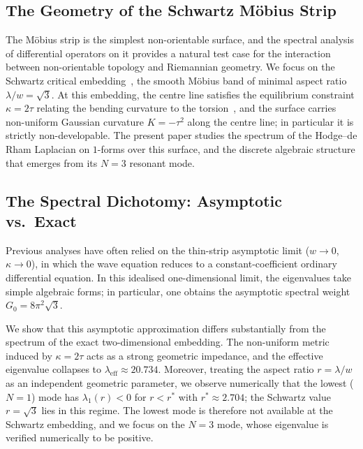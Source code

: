 \documentclass[11pt,a4paper]{article}
\begin{document}
\subsection{The Geometry of the Schwartz M\"obius Strip}
The M\"obius strip is the simplest non-orientable surface, and the spectral analysis of differential operators on it provides a natural test case for the interaction between non-orientable topology and Riemannian geometry. We focus on the Schwartz critical embedding~\cite{Schwartz2023}, the smooth M\"obius band of minimal aspect ratio $\lambda/w = \sqrt{3}$. At this embedding, the centre line satisfies the equilibrium constraint $\kappa = 2\tau$ relating the bending curvature to the torsion~\cite{Starostin2007}, and the surface carries non-uniform Gaussian curvature $K = -\tau^2$ along the centre line; in particular it is strictly non-developable. The present paper studies the spectrum of the Hodge--de Rham Laplacian on $1$-forms over this surface, and the discrete algebraic structure that emerges from its $N=3$ resonant mode.

\subsection{The Spectral Dichotomy: Asymptotic vs.\ Exact}
Previous analyses have often relied on the thin-strip asymptotic limit ($w \to 0$, $\kappa \to 0$), in which the wave equation reduces to a constant-coefficient ordinary differential equation. In this idealised one-dimensional limit, the eigenvalues take simple algebraic forms; in particular, one obtains the asymptotic spectral weight $G_0 = 8\pi^2\sqrt{3}$.

We show that this asymptotic approximation differs substantially from the spectrum of the exact two-dimensional embedding. The non-uniform metric induced by $\kappa = 2\tau$ acts as a strong geometric impedance, and the effective eigenvalue collapses to $\lambda_{\text{eff}} \approx 20.734$. Moreover, treating the aspect ratio $r = \lambda/w$ as an independent geometric parameter, we observe numerically that the lowest ($N=1$) mode has $\lambda_{1}(r)<0$ for $r<r^{*}$ with $r^{*}\approx 2.704$; the Schwartz value $r=\sqrt{3}$ lies in this regime. The lowest mode is therefore not available at the Schwartz embedding, and we focus on the $N=3$ mode, whose eigenvalue is verified numerically to be positive.
\end{document}
